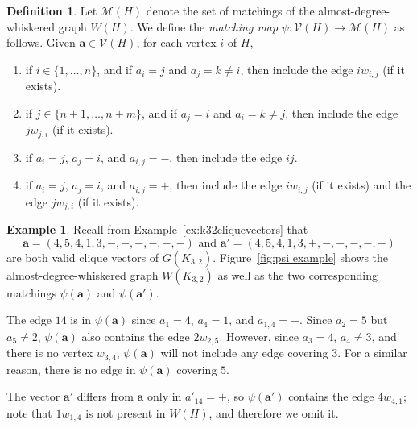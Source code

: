 \documentclass[12pt]{amsart}
\theoremstyle{definition}
\newtheorem{definition}[theorem]{Definition}
\newtheorem{example}[theorem]{Example}
\newcommand\ba{\mathbf{a}}
\newcommand\calM{\mathcal{M}}
\newcommand\calV{\mathcal{V}}
\begin{document}
\begin{definition}\label{def:matchingmap}
    Let $\calM(H)$ denote the set of matchings of the almost-degree-whiskered graph $W(H)$. 
    We define the \emph{matching map} $\psi: \calV(H) \to \calM(H)$ as follows.
    Given $\ba\in \calV(H)$, for each vertex $i$ of $H$,
    \begin{enumerate}
        
        \item if $i \in \{1,\dots,n\}$, and if $a_i = j$ and $a_j = k \neq i$, then include the edge $iw_{i,j}$ (if it exists). 
        
        \item if $j \in \{n+1,\dots,n+m\}$, and if $a_j = i$ and $a_i = k \neq j$, then include the edge $jw_{j,i}$ (if it exists).
        
        \item if $a_i = j$, $a_j = i$, and $a_{i,j} = -$, then include the edge $ij$.
        
        \item if $a_i = j$, $a_j = i$, and $a_{i,j} = +$, then include the edge $iw_{i,j}$ (if it exists) and the edge $jw_{j,i}$ (if it exists). 
    \end{enumerate}    
\end{definition}

\begin{example}\label{ex:matchingmap}
    Recall from Example~\ref{ex:k32cliquevectors} that     
    \[
        \ba=(4,5,4,1,3,-,-,-,-,-,-) \text{ and } \ba' = (4,5,4,1,3,+,-,-,-,-,-)
    \]
    are both valid clique vectors of $G(K_{3,2})$.
    Figure~\ref{fig:psi example} shows the almost-degree-whiskered graph $W(K_{3,2})$ as well as the two corresponding matchings $\psi(\ba)$ and $\psi(\ba')$.

    The edge $14$ is in $\psi(\ba)$ since $a_1 = 4$, $a_4=1$, and $a_{1,4}=-$.
    Since $a_2 = 5$ but $a_5 \neq 2$, $\psi(\ba)$ also contains the edge $2w_{2,5}$.
    However, since $a_3 = 4$, $a_4 \neq 3$, and there is no vertex $w_{3,4}$, $\psi(\ba)$ will not include any edge covering $3$.
    For a similar reason, there is no edge in $\psi(\ba)$ covering $5$.

    The vector $\ba'$ differs from $\ba$ only in $a'_{14}=+$, so $\psi(\ba')$ contains the edge $4w_{4,1}$; note that $1w_{1,4}$ is not present in $W(H)$, and therefore we omit it.
\end{example}
\end{document}
